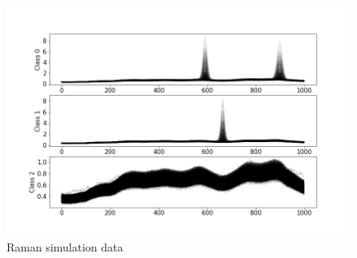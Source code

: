 \documentclass{article}
\begin{document}
\begin{figure}[H]
	\centering
	\includegraphics[width=1\linewidth]{raman_sim_training_data_2.png}  
	\caption{Raman simulation data}
	\label{fig:raman}
\end{figure}
\end{document}
